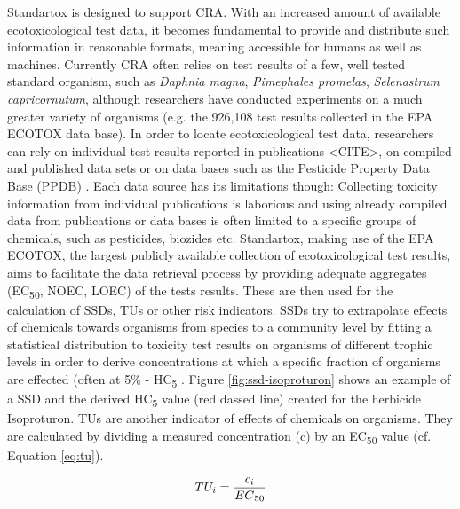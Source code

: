 Standartox is designed to support CRA. With an increased amount of available ecotoxicological test data, it becomes fundamental to provide and distribute such information in reasonable formats, meaning accessible for humans as well as machines. Currently CRA often relies on test results of a few, well tested standard organism, such as \textit{Daphnia magna}, \textit{Pimephales promelas}, \textit{Selenastrum capricornutum}, although researchers have conducted experiments on a much greater variety of organisms (e.g. the 926,108 test results collected in the EPA ECOTOX data base). In order to locate ecotoxicological test data, researchers can rely on individual test results reported in publications <CITE>, on compiled and published data sets \citep{malaj_organic_2014} or on data bases such as the Pesticide Property Data Base (PPDB) \citep{lewis_international_2016}. Each data source has its limitations though: Collecting toxicity information from individual publications is laborious and using already compiled data from publications or data bases is often limited to a specific groups of chemicals, such as pesticides, biozides etc. Standartox, making use of the EPA ECOTOX, the largest publicly available collection of ecotoxicological test results, aims to facilitate the data retrieval process by providing adequate aggregates (EC\textsubscript{50}, NOEC, LOEC) of the tests results. These are then used for the calculation of SSDs, TUs or other risk indicators. SSDs try to extrapolate effects of chemicals towards organisms from species to a community level by fitting a statistical distribution to toxicity test results on organisms of different trophic levels in order to derive concentrations at which a specific fraction of organisms are effected (often at 5\% - HC\textsubscript{5} \citep{posthuma_species_2002}. Figure \ref{fig:ssd-isoproturon} shows an example of a SSD and the derived HC\textsubscript{5} value (red dassed line) created for the herbicide Isoproturon. TUs are another indicator of effects of chemicals on organisms. They are calculated by dividing a measured concentration (c) by an EC\textsubscript{50} value (cf. Equation \ref{eq:tu}).

\begin{equation}
    TU_i = \frac{c_i}{EC\textsubscript{50}}
    \label{eq:tu}
\end{equation}

